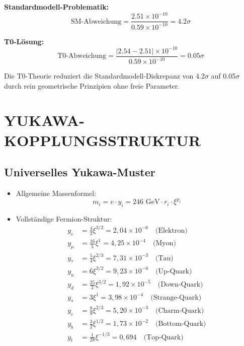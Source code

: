 \documentclass[12pt,a4paper]{article}
\begin{document}
\textbf{Standardmodell-Problematik:}
\begin{equation}
	\text{SM-Abweichung} = \frac{2.51 \times 10^{-10}}{0.59 \times 10^{-10}} = 4.2\sigma
\end{equation}

\textbf{T0-Lösung:}
\begin{equation}
	\text{T0-Abweichung} = \frac{|2.54 - 2.51| \times 10^{-10}}{0.59 \times 10^{-10}} = 0.05\sigma
\end{equation}

Die T0-Theorie reduziert die Standardmodell-Diskrepanz von 4.2$\sigma$ auf 0.05$\sigma$ durch rein geometrische Prinzipien ohne freie Parameter.
\section{YUKAWA-KOPPLUNGSSTRUKTUR}

\subsection{Universelles Yukawa-Muster}
\begin{itemize}
	\item Allgemeine Massenformel:
	$$m_i = v \cdot y_i = 246 \text{ GeV} \cdot r_i \cdot \xi^{p_i}$$
	
	\item Vollständige Fermion-Struktur:
	\begin{align*}
		y_e &= \frac{4}{3}\xi^{3/2} = 2{,}04 \times 10^{-6} \quad \text{(Elektron)}\\
		y_\mu &= \frac{16}{5}\xi^1 = 4{,}25 \times 10^{-4} \quad \text{(Myon)}\\
		y_\tau &= \frac{5}{4}\xi^{2/3} = 7{,}31 \times 10^{-3} \quad \text{(Tau)}\\
		y_u &= 6\xi^{3/2} = 9{,}23 \times 10^{-6} \quad \text{(Up-Quark)}\\
		y_d &= \frac{25}{2}\xi^{3/2} = 1{,}92 \times 10^{-5} \quad \text{(Down-Quark)}\\
		y_s &= 3\xi^1 = 3{,}98 \times 10^{-4} \quad \text{(Strange-Quark)}\\
		y_c &= \frac{8}{9}\xi^{2/3} = 5{,}20 \times 10^{-3} \quad \text{(Charm-Quark)}\\
		y_b &= \frac{3}{2}\xi^{1/2} = 1{,}73 \times 10^{-2} \quad \text{(Bottom-Quark)}\\
		y_t &= \frac{1}{28}\xi^{-1/3} = 0{,}694 \quad \text{(Top-Quark)}
	\end{align*}
\end{itemize}
\end{document}
